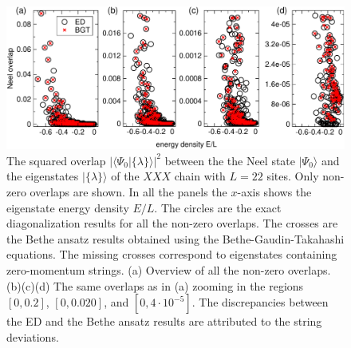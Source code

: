 \documentclass[11pt]{iopart}
\begin{document}
\begin{figure}[t]
\begin{center}
\includegraphics[width=.9\textwidth]{./draft_figs/L20_BT_check}
\end{center}
\caption{ The squared overlap $|\langle\Psi_0|\{\lambda\}\rangle|^2$ between the the 
 Neel state $|\Psi_0\rangle$ and the eigenstates $|\{\lambda\}\rangle$ of the $XXX$ 
 chain with $L=22$ sites. Only non-zero overlaps are shown. In all the panels the 
 $x$-axis shows the eigenstate energy density $E/L$. The circles are the exact 
 diagonalization results for all the non-zero overlaps. The crosses are the Bethe 
 ansatz results obtained using the Bethe-Gaudin-Takahashi equations. The missing 
 crosses correspond to eigenstates containing zero-momentum strings. (a) Overview 
 of all the non-zero overlaps. (b)(c)(d) The same overlaps as in (a) zooming in 
 the regions $[0,0.2]$, $[0,0.020]$, and $[0,4\cdot 10^{-5}]$. The discrepancies 
 between the ED and the Bethe ansatz results are attributed to the string deviations. 
}
\label{fig1-BGT-check}
\end{figure}
\end{document}
